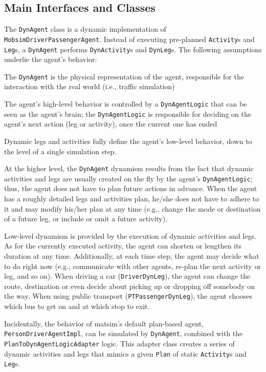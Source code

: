 \subsection{Main Interfaces and Classes}
The \lstinline$DynAgent$ class is a dynamic implementation of \lstinline$MobsimDriverPassengerAgent$. Instead of executing pre-planned \lstinline$Activity$s and \lstinline$Leg$s, a \lstinline$DynAgent$ performs \lstinline$DynActivity$s and \lstinline$DynLeg$s. The following assumptions underlie the agent's behavior:
%
\begin{compactitem}
	\item The \lstinline$DynAgent$ is the physical representation of the agent, responsible for the interaction with the real world (i.e., traffic simulation)

	\item The agent's high-level behavior is controlled by a \lstinline$DynAgentLogic$ that can be seen as the agent's brain; the \lstinline$DynAgentLogic$ is responsible for deciding on the agent's next action (leg or activity), once the current one has ended
	
	\item Dynamic legs and activities fully define the agent's low-level behavior, down to the level of a single simulation step.
\end{compactitem}
%
At the higher level, the \lstinline$DynAgent$  dynamism results from the fact that dynamic activities and legs are usually created on the fly by the agent's \lstinline$DynAgentLogic$; thus, the agent does not have to plan future actions in advance. When the agent has a roughly detailed legs and activities plan, he/she does not have to adhere to it and may modify his/her plan at any time (e.g., change the mode or destination of a future leg, or include or omit a future activity).

Low-level dynamism is provided by the execution of dynamic activities and legs. As for the currently executed activity, the agent can shorten or lengthen its duration at any time. Additionally, at each time step, the agent may decide what to do right now (e.g., communicate with other agents, re-plan the next activity or leg, and so on). When driving a car (\lstinline$DriverDynLeg$), the agent can change the route, destination or even decide about picking up or dropping off somebody on the way. When using public transport (\lstinline$PTPassengerDynLeg$), the agent chooses which bus to get on and at which stop to exit.

Incidentally, the behavior of \gls{matsim}'s default plan-based agent, \lstinline$PersonDriverAgentImpl$, can be simulated by \lstinline$DynAgent$, combined with the \lstinline$PlanToDynAgentLogicAdapter$ logic. This adapter class creates a series of dynamic activities and legs that mimics a given \lstinline$Plan$ of static \lstinline$Activity$s and \lstinline$Leg$s.

